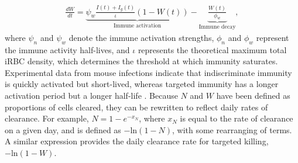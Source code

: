 \documentclass[10pt,letterpaper]{article}
\begin{document}
\begin{eqnarray}
\label{eq:scheme14}
    \frac{dW}{dt}=\underbrace{\psi_{w}\frac{I(t)+I_{g}(t)}{\iota}(1-W(t))}_{\text{Immune activation}}-\underbrace{\frac{W(t)}{\phi_{w}}}_{\text{Immune decay}},
\end{eqnarray}
where $\psi_n$ and $\psi_w$ denote the immune activation strengths, $\phi_n$ and $\phi_w$ represent the immune activity half-lives, and $\iota$ represents the theoretical maximum total iRBC density, which determines the threshold at which immunity saturates. Experimental data from mouse infections indicate that indiscriminate immunity is quickly activated but short-lived, whereas targeted immunity has a longer activation period but a longer half-life \cite{kamiya_uncovering_2020}. Because $N$ and $W$ have been defined as proportions of cells cleared, they can be rewritten to reflect daily rates of clearance. For example, $N=1-e^{-x_N}$, where $x_N$ is equal to the rate of clearance on a given day, and is defined as $-\mathrm{ln}\left(1-N\right)$, with some rearranging of terms. A similar expression provides the daily clearance rate for targeted killing, $-\mathrm{ln}\left(1-W\right)$. \newline
\end{document}
